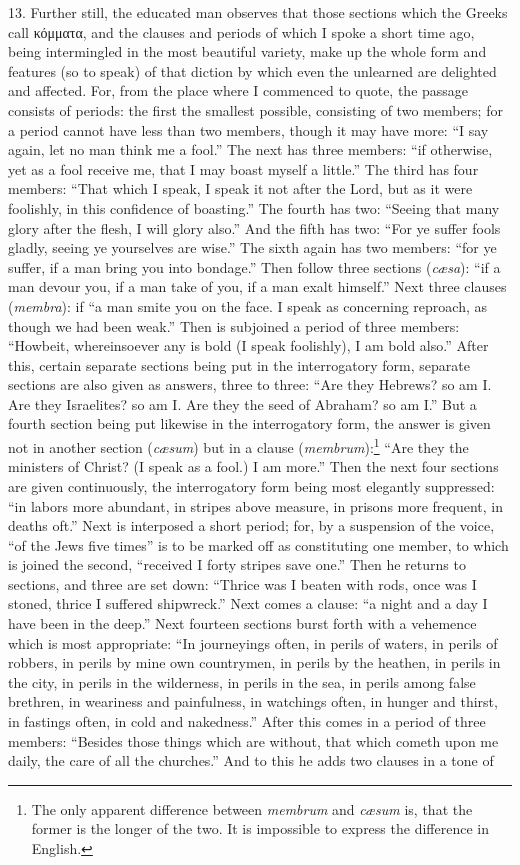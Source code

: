 13. Further still, the educated man observes that those sections which the Greeks call \textgreek{κόμματα}, and the clauses and periods of which I spoke a short time ago, being intermingled in the most beautiful variety, make up the whole form and features (so to speak) of that diction by which even the unlearned are delighted and affected. For, from the place where I commenced to quote, the passage consists of periods: the first the smallest possible, consisting of two members; for a period cannot have less than two members, though it may have more: “I say again, let no man think me a fool.” The next has three members: “if otherwise, yet as a fool receive me, that I may boast myself a little.” The third has four members: “That which I speak, I speak it not after the Lord, but as it were foolishly, in this confidence of boasting.” The fourth has two: “Seeing that many glory after the flesh, I will glory also.” And the fifth has two: “For ye suffer fools gladly, seeing ye yourselves are wise.” The sixth again has two members: “for ye suffer, if a man bring you into bondage.” Then follow three sections (\emph{cæsa}): “if a man devour you, if a man take of you, if a man exalt himself.” Next three clauses (\emph{membra}): if  “a man smite you on the face. I speak as concerning reproach, as though we had been weak.” Then is subjoined a period of three members: “Howbeit, whereinsoever any is bold (I speak foolishly), I am bold also.” After this, certain separate sections being put in the interrogatory form, separate sections are also given as answers, three to three: “Are they Hebrews? so am I. Are they Israelites? so am I. Are they the seed of Abraham? so am I.” But a fourth section being put likewise in the interrogatory form, the answer is given not in another section (\emph{cæsum}) but in a clause (\emph{membrum}):\footnote{The only apparent difference between \emph{membrum} and \emph{cæsum} is, that the former is the longer of the two. It is impossible to express the difference in English.} “Are they the ministers of Christ? (I speak as a fool.) I am more.” Then the next four sections are given continuously, the interrogatory form being most elegantly suppressed: “in labors more abundant, in stripes above measure, in prisons more frequent, in deaths oft.” Next is interposed a short period; for, by a suspension of the voice, “of the Jews five times” is to be marked off as constituting one member, to which is joined the second, “received I forty stripes save one.” Then he returns to sections, and three are set down: “Thrice was I beaten with rods, once was I stoned, thrice I suffered shipwreck.” Next comes a clause: “a night and a day I have been in the deep.” Next fourteen sections burst forth with a vehemence which is most appropriate: “In journeyings often, in perils of waters, in perils of robbers, in perils by mine own countrymen, in perils by the heathen, in perils in the city, in perils in the wilderness, in perils in the sea, in perils among false brethren, in weariness and painfulness, in watchings often, in hunger and thirst, in fastings often, in cold and nakedness.” After this comes in a period of three members: “Besides those things which are without, that which cometh upon me daily, the care of all the churches.” And to this he adds two clauses in a tone of 